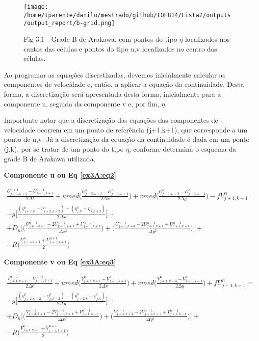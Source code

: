\documentclass[11pt]{article}
\makeatletter
\def\maxwidth{\ifdim\Gin@nat@width>\linewidth\linewidth
    \else\Gin@nat@width\fi}
\let\Oldincludegraphics\includegraphics
\renewcommand{\includegraphics}[1]{\Oldincludegraphics[width=.8\maxwidth]{#1}}
\makeatother
\begin{document}
\begin{figure}[!ht]
\centering
\centerline{\hbox{\texttt{[image: /home/tparente/danilo/mestrado/github/IOF814/Lista2/outputs/output\_report/b-grid.png]}}}
\caption{Fig 3.1 - Grade B de Arakawa, com pontos do tipo \(\eta\) localizados nos cantos das células
e pontos do tipo u,v localizados no centro das células. }
\label{ex3A:fig1}
\end{figure}

Ao programar as equações discretizadas, devemos inicialmente calcular as
componentes de velocidade e, então, a aplicar a equação da continuidade.
Desta forma, a discretização será apresentada desta forma, inicialmente
para a componente u, seguida da componente v e, por fim, \(\eta\).

Importante notar que a discretização das equações das componentes de
velocidade ocorrem em um ponto de referência (j+1,k+1), que corresponde
a um ponto de u,v. Já a discretização da equação da continuidade é dada
em um ponto (j,k), por se tratar de um ponto do tipo \(\eta\), conforme
determina o esquema da grade B de Arakawa utilizada.

\textbf{Componente u ou Eq \ref{ex3A:eq2}}

\begin{equation}
\begin{aligned}
\frac{U^{n+1}_{j+1,k+1} - U^{n-1}_{j+1,k+1}}{2\Delta{t}} + umed\bigg( \frac{U^{n}_{j+3,k+1} - U^{n}_{j-1,k+1}}{2\Delta{x}} \bigg) + vmed\bigg( \frac{U^{n}_{j+1,k+3} - U^{n}_{j+1,k-1}}{2\Delta{y}} \bigg) - fV^{n}_{j+1,k+1} = \\
-g\bigg[  \frac{(\eta^{n}_{j+2,k} + \eta^{n}_{j+2,k+2}) -(\eta^{n}_{j,k} + \eta^{n}_{j,k+2} ) }{2\Delta{x}}  \bigg] + \\
+ D_h\bigg[ \bigg( \frac{U^{n-1}_{j+3,k+1} - 2U^{n-1}_{j+1,k+1} + U^{n-1}_{j-1,k+1}}{\Delta{x^2}} \bigg) + \bigg( \frac{U^{n-1}_{j+1,k+3} -2U^{n-1}_{j+1,k+1} + U^{n-1}_{j+1,k-1}}{\Delta{y^2}} \bigg) \bigg] + \\
- R\bigg( \frac{U^{n}_{j+1,k+1} + U^{n+1}_{j+1,k+1}}{2} \bigg)
\label{ex3A:eq4}
\end{aligned}
\end{equation}

\textbf{Componente v ou Eq \ref{ex3A:eq3}}

\begin{equation}
\begin{aligned}
\frac{V^{n+1}_{j+1,k+1} - V^{n-1}_{j+1,k+1}}{2\Delta{t}} + umed\bigg( \frac{V^{n}_{j+3,k+1} - V^{n}_{j-1,k+1}}{2\Delta{x}} \bigg) + vmed\bigg( \frac{V^{n}_{j+1,k+3} - V^{n}_{j+1,k-1}}{2\Delta{y}} \bigg) + fU^{n}_{j+1,k+1} = \\
-g\bigg[ \frac{(\eta^{n}_{j+2,k+2} + \eta^{n}_{j,k+2}) - (\eta^{n}_{j+2,k} + \eta^{n}_{j,k} ) }{2\Delta{y}}  \bigg] + \\
+ D_h\bigg[ \bigg( \frac{V^{n-1}_{j+3,k+1} - 2V^{n-1}_{j+1,k+1} + V^{n-1}_{j-1,k+1}}{\Delta{x^2}} \bigg) + \bigg( \frac{V^{n-1}_{j+1,k+3} -2V^{n-1}_{j+1,k+1} + V^{n-1}_{j+1,k-1}}{\Delta{y^2}} \bigg) \bigg] + \\
- R\bigg( \frac{V^{n}_{j+1,k+1} + V^{n+1}_{j+1,k+1}}{2} \bigg)
\label{ex3A:eq5}
\end{aligned}
\end{equation}
\end{document}
